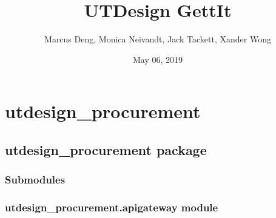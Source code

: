 \documentclass[letterpaper,10pt,english]{sphinxmanual}
\title{UTDesign GettIt}
\date{May 06, 2019}
\author{Marcus Deng, Monica Neivandt, Jack Tackett, Xander Wong}
\begin{document}
\pagestyle{empty}
\sphinxmaketitle
\pagestyle{plain}
\sphinxtableofcontents
\pagestyle{normal}
\label{\detokenize{index::doc}}



\chapter{utdesign\_procurement}
\label{\detokenize{apidoc/modules:utdesign-procurement}}\label{\detokenize{apidoc/modules::doc}}

\section{utdesign\_procurement package}
\label{\detokenize{apidoc/utdesign_procurement:utdesign-procurement-package}}\label{\detokenize{apidoc/utdesign_procurement::doc}}

\subsection{Submodules}
\label{\detokenize{apidoc/utdesign_procurement:submodules}}

\subsection{utdesign\_procurement.apigateway module}
\label{\detokenize{apidoc/utdesign_procurement:module-utdesign_procurement.apigateway}}\label{\detokenize{apidoc/utdesign_procurement:utdesign-procurement-apigateway-module}}
\end{document}
